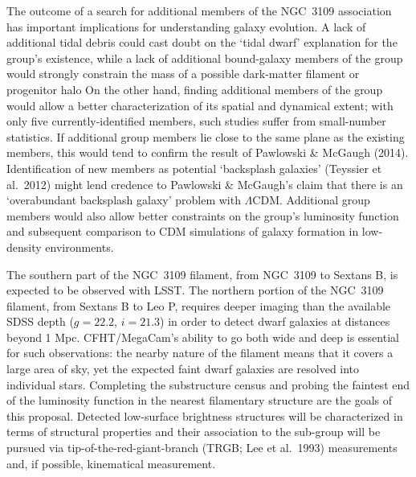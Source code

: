 The outcome of a search for additional members of the NGC~3109 association has important implications for
understanding galaxy evolution. A lack of additional tidal debris could cast doubt on the `tidal dwarf' 
explanation for the group's existence, while a lack of additional bound-galaxy members of the group 
would strongly constrain the mass of a possible dark-matter filament or progenitor halo
On the other hand, finding additional members of the group would allow a better characterization of its
spatial and dynamical extent; with only five currently-identified members, such studies 
suffer from small-number statistics. If additional group members lie close to the same plane
as the existing members, this would tend to confirm the result of Pawlowski \& McGaugh (2014). 
Identification of new members as potential `backsplash galaxies' (Teyssier et al.\ 2012) might lend credence to 
 Pawlowski \& McGaugh's
claim that there is an `overabundant backsplash galaxy' problem with $\Lambda$CDM.
Additional group members 
would also allow better constraints on the group's  luminosity function and subsequent comparison to CDM 
simulations of galaxy formation in  low-density environments.




The southern part of the NGC~3109 filament, from NGC~3109 to Sextans B, is expected to be observed with LSST.
The northern portion of  the NGC~3109 filament, from Sextans B to Leo P, requires deeper imaging than
the available  SDSS  depth ($g=22.2$, $i=21.3$) in order to detect dwarf galaxies at distances beyond 1 Mpc.
CFHT/MegaCam's ability to go both wide and deep is essential for such observations: the nearby nature of the 
filament means that it covers a large area of sky, yet the expected faint dwarf galaxies are resolved into individual stars.
Completing the substructure census and probing the faintest end of the luminosity function in the nearest filamentary 
structure are the goals of this proposal. Detected low-surface brightness structures will be characterized in terms of 
structural properties and their association to the sub-group will be pursued via tip-of-the-red-giant-branch 
(TRGB; Lee et al.\ 1993) measurements and, if possible, kinematical measurement.


